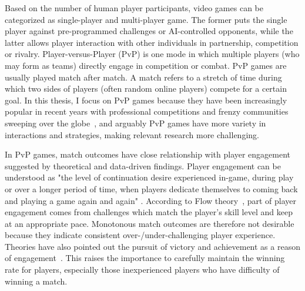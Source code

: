 Based on the number of human player participants, video games can be categorized as single-player and multi-player game. The former puts the single player against pre-programmed challenges or AI-controlled opponents, while the latter allows player interaction with other individuals in partnership, competition or rivalry. Player-versus-Player (PvP) is one mode in which multiple players (who may form as teams) directly engage in competition or combat. PvP games are usually played match after match. A match refers to a stretch of time during which two sides of players (often random online players) compete for a certain goal. In this thesis, I focus on PvP games because they have been increasingly popular in recent years with professional competitions and frenzy communities sweeping over the globe~\cite{superdata2016}, and arguably PvP games have more variety in interactions and strategies, making relevant research more challenging. 

In PvP games, match outcomes have close relationship with player engagement suggested by theoretical and data-driven findings. Player engagement can be understood as "the level of continuation desire experienced in-game, during play or over a longer period of time, when players dedicate themselves to coming back and playing a game again and again" \cite{schoenau2011player}. According to Flow theory~\cite{sweetser2005gameflow,flow1990psychology,chen2007flow}, part of player engagement comes from challenges which match the player's skill level and keep at an appropriate pace. Monotonous match outcomes are therefore not desirable because they indicate consistent over-/under-challenging player experience. Theories have also pointed out the pursuit of victory and achievement as a reason of engagement~\cite{schoenau2011player,yee2006motivations,sherry2006video,wu2010falling}. This raises the importance to carefully maintain the winning rate for players, especially those inexperienced players who have difficulty of winning a match. 

